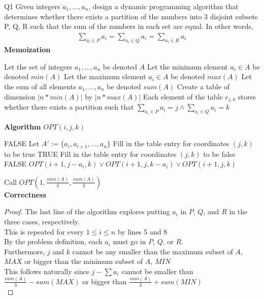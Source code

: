 \begin{problem}
  {Q1}
  Given integers $a_1, \dots , a_n$, design a dynamic programming algorithm that determines
  whether there exists a partition of the numbers into 3 disjoint subsets P, Q, R such that the sum
  of the numbers in each set are equal. In other words,
  \begin{align*}
      \sum_{a_i \in P} a_i = \sum_{a_i \in Q} a_i = \sum_{a_i \in R} a_i
  \end{align*}
  \noindent
  \textbf{Memoization}
  \begin{algorithmic}[1]
    \STATE Let the set of integers $a_1, \dots, a_n$ be denoted $A$
    \STATE Let the minimum element $a_i \in A$ be denoted $min(A)$
    \STATE Let the maximum element $a_i \in A$ be denoted $max(A)$
    \STATE Let the sum of all elements $a_1, \dots, a_n$ be denoted $sum(A)$
    \STATE Create a table of dimension $|n * min(A)|$ by $|n * max(A)|$
    \STATE Each element of the table $e_{j, k}$ stores whether there exists a partition such that
           $\sum_{a_i \in P} a_i = j \land \sum_{a_i \in Q} a_i = k$
  \end{algorithmic}
  \noindent
  \textbf{Algorithm}
  $OPT(i, j, k)$
  \begin{algorithmic}[1]
    \RETURN FALSE
    \ENDIF
    \STATE Let $A' := \{a_i, a_{i+1}, \dots, a_n\}$
    \STATE Fill in the table entry for coordinates $(j, k)$ to be true
    \RETURN TRUE
    \STATE Fill in the table entry for coordinates $(j, k)$ to be false
    \RETURN FALSE
    \ENDIF
    \RETURN $OPT(i+1, j-a_i, k) \lor OPT(i+1, j, k-a_i) \lor OPT(i+1, j, k)$
  \end{algorithmic}
  Call $OPT(1, \frac{sum(A)}{3}, \frac{sum(A)}{3})$ \\
  \textbf{Correctness}
  \begin{proof}
      The last line of the algorithm explores putting $a_i$ in $P$, $Q$, and $R$ in the three cases, respectively. \\
      This is repeated for every $1 \leq i \leq n$ by lines 5 and 8 \\
      By the problem definition, each $a_i$ must go in $P$, $Q$, or $R$. \\
      Furthermore, $j$ and $k$ cannot be any smaller than the maximum subset of $A$, $MAX$ or bigger than the minimum subset of $A$, $MIN$ \\
      This follows naturally since $j - \sum a_i$ cannot be smaller than $\frac{sum(A)}{3} - sum(MAX)$ or bigger than $\frac{sum(A)}{3} + sum(MIN)$ \\

\end{proof}
\end{problem}
